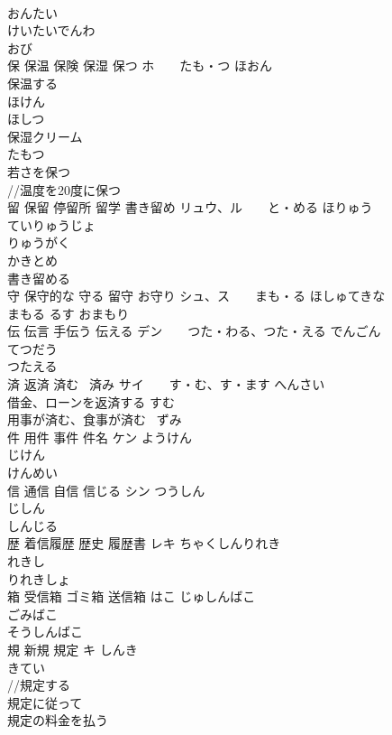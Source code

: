 \documentclass[8pt]{extreport}
\begin{document}
\begin{CJK}{UTF8}{min}
\\	おんたい 
\\	けいたいでんわ　
\\	おび 
\\	保 保温 保険 保湿 保つ	ホ　　たも・つ ほおん 
\\	保温する 
\\	ほけん 
\\	ほしつ 
\\	保湿クリーム 
\\	たもつ 
\\	若さを保つ 
\\	//温度を20度に保つ
\\	留 保留 停留所 留学 書き留め	リュウ、ル　　と・める ほりゅう 
\\	ていりゅうじょ 
\\	りゅうがく 
\\	かきとめ 
\\	書き留める
\\	守 保守的な 守る 留守 お守り	シュ、ス　　まも・る ほしゅてきな 
\\	まもる るす おまもり 
\\	伝 伝言 手伝う 伝える	デン　　つた・わる、つた・える でんごん 
\\	てつだう 
\\	つたえる 
\\	済 返済 済む ~済み	サイ　　す・む、す・ます へんさい 
\\	借金、ローンを返済する すむ 
\\	用事が済む、食事が済む ~ずみ 
\\	件 用件 事件 件名	ケン ようけん 
\\	じけん 
\\	けんめい 
\\	信 通信 自信 信じる	シン つうしん　
\\	じしん 
\\	しんじる 
\\	歴 着信履歴 歴史 履歴書	レキ ちゃくしんりれき 
\\	れきし 
\\	りれきしょ 
\\	箱 受信箱 ゴミ箱 送信箱	はこ じゅしんばこ 
\\	ごみばこ 
\\	そうしんばこ 
\\	規 新規 規定	キ しんき 
\\	きてい 
\\	//規定する 
\\	規定に従って 
\\	規定の料金を払う

\end{CJK}
\end{document}

